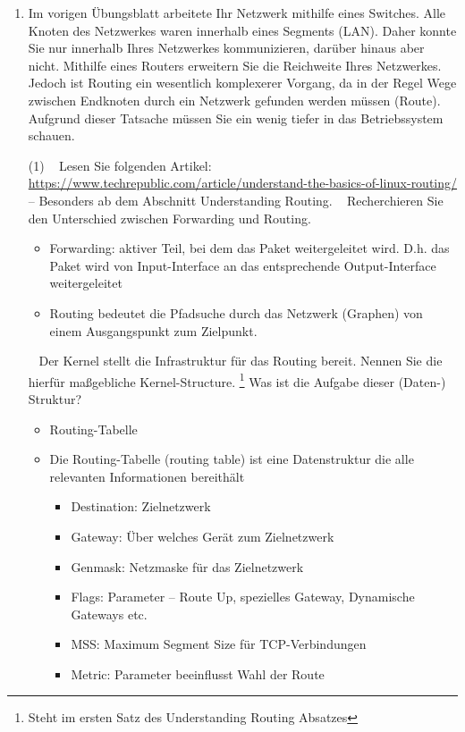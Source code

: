 \documentclass[paper=a4,fontsize=11pt]{scrartcl}%
\numberwithin{equation}{section}
\begin{document}
\begin{center}
\begin{enumerate}
\begin{tasks}
\begin{itemize}
	\end{itemize}
	\end{tasks}
	\item Im vorigen Übungsblatt arbeitete Ihr Netzwerk mithilfe eines Switches. Alle Knoten des Netzwerkes waren innerhalb eines Segments (LAN). Daher konnte Sie nur innerhalb Ihres Netzwerkes kommunizieren, darüber hinaus aber nicht. Mithilfe eines Routers erweitern Sie die Reichweite Ihres Netzwerkes. Jedoch ist Routing ein wesentlich komplexerer Vorgang, da in der Regel Wege zwischen Endknoten durch ein Netzwerk gefunden werden müssen (Route). Aufgrund dieser Tatsache müssen Sie ein wenig tiefer in das Betriebssystem schauen.
	\begin{tasks}(1)
	\task~ Lesen Sie folgenden Artikel: \url{https://www.techrepublic.com/article/understand-the-basics-of-linux-routing/} -- Besonders ab dem Abschnitt \glqq Understanding Routing\grqq.
	\task~ Recherchieren Sie den Unterschied zwischen Forwarding und Routing.
	\begin{itemize}
		\item Forwarding: aktiver Teil, bei dem das Paket weitergeleitet wird. D.h. das Paket wird von Input-Interface an das entsprechende Output-Interface weitergeleitet
		\item Routing bedeutet die Pfadsuche durch das Netzwerk (Graphen) von einem Ausgangspunkt zum Zielpunkt. 
	\end{itemize}
	\task~ Der Kernel stellt die Infrastruktur für das Routing bereit. Nennen Sie die hierfür maßgebliche Kernel-Structure. \footnote{Steht im ersten Satz des Understanding Routing Absatzes} Was ist die Aufgabe dieser (Daten-) Struktur?
	\begin{itemize}
		\item Routing-Tabelle
		\item Die Routing-Tabelle (routing table) ist eine Datenstruktur die alle relevanten Informationen bereithält
		\begin{itemize}
			\item Destination: Zielnetzwerk
			\item Gateway: Über welches Gerät zum Zielnetzwerk
			\item Genmask: Netzmaske für das Zielnetzwerk
			\item Flags: Parameter -- Route Up, spezielles Gateway, Dynamische Gateways etc.
			\item MSS: Maximum Segment Size für TCP-Verbindungen 
			\item Metric: Parameter beeinflusst Wahl der Route  

\end{itemize}
\end{itemize}
\end{tasks}
\end{enumerate}
\end{center}
\end{document}
